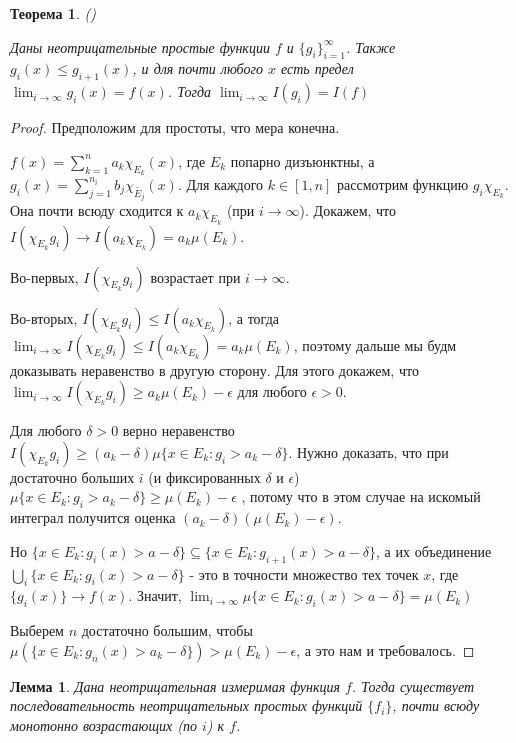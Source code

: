 \documentclass[a4paper]{article}
\theoremstyle{indented}
\newtheorem{theorem}{Теорема}
\newtheorem{lemma}{Лемма}
\theoremstyle{definition}
\theoremstyle{remark}
\DeclareMathOperator{\ra}{\rightarrow}
\begin{document}
\begin{theorem}
()
 
Даны неотрицательные простые функции $f$ и $\{g_i\}_{i=1}^{\infty}$. Также $g_i(x) \leq g_{i+1}(x)$, и для почти любого $x$ есть предел $\lim_{i \ra \infty} g_i(x) = f(x)$. Тогда $\lim_{i \ra \infty} I(g_i)=I(f)$
\end{theorem}
\begin{proof}
 
 
Предположим для простоты, что мера конечна.
 
$f(x)=\sum_{k=1}^n a_k\chi_{E_k}(x)$, где $E_k$ попарно дизъюнктны, а $g_i(x)=\sum_{j=1}^{n_i} b_j \chi_{\tilde{E_j}}(x)$. Для каждого $k \in [1, n]$ рассмотрим функцию $g_i \chi_{E_k}$. Она почти всюду сходится к $a_k \chi_{E_k}$ (при $i \ra \infty$).
Докажем, что $I(\chi_{E_k}g_i) \ra I(a_k\chi_{E_k}) = a_k\mu(E_k)$.
 
Во-первых, $I(\chi_{E_k}g_i)$ возрастает при $i \ra \infty$.
 
Во-вторых, $I(\chi_{E_k}g_i) \leq I(a_k\chi_{E_k})$, а тогда $\lim_{i \ra \infty} I(\chi_{E_k}g_i) \leq I(a_k\chi_{E_k})=a_k\mu(E_k)$, поэтому дальше мы будм доказывать неравенство в другую сторону. Для этого докажем, что $\lim_{i \ra \infty} I(\chi_{E_k}g_i) \geq a_k\mu(E_k)-\epsilon$ для любого $\epsilon>0$.
 
Для любого $\delta>0$ верно неравенство $I(\chi_{E_k}g_i) \geq (a_k-\delta)\mu\{x\in E_k: g_i > a_k-\delta \}$. Нужно доказать, что при достаточно больших $i$ (и фиксированных $\delta$ и $\epsilon$) $\mu\{x \in E_k: g_i > a_k-\delta\} \geq \mu(E_k)-\epsilon$ , потому что в этом случае на искомый интеграл получится оценка $(a_k-\delta)(\mu(E_k)-\epsilon)$.
 
 
Но $\{x\in E_k : g_i(x)> a-\delta\} \subseteq \{x \in E_k: g_{i+1}(x)>a-\delta\}$, а их объединение $\bigcup_i \{x\in E_k : g_i(x)> a-\delta\}$ - это в точности множество тех точек $x$, где $\{g_i(x)\} \ra f(x)$. Значит, $\lim_{i \ra \infty} \mu\{x\in E_k : g_i(x)> a-\delta\} =\mu(E_k)$ 
 
Выберем $n$ достаточно большим, чтобы $\mu(\{x \in E_k: g_n(x)>a_k-\delta\})>\mu(E_k)-\epsilon$, а это нам и требовалось.
\end{proof}
\begin{lemma}
Дана неотрицательная измеримая функция $f$. Тогда существует последовательность неотрицательных простых функций $\{f_i\}$, почти всюду монотонно возрастающих (по $i$) к $f$.
\end{lemma}
\end{document}
